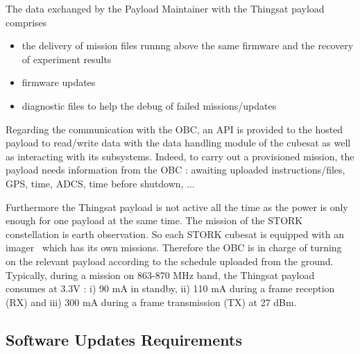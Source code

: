 The data exchanged by the Payload Maintainer with the Thingsat payload comprises 
\begin{itemize}
    \item the delivery of mission files runnng above the same firmware and the
    recovery of experiment results
    \item firmware updates
    \item diagnostic files to help the debug of failed missions/updates
\end{itemize} 



Regarding the communication with the OBC, an API is provided to the hosted
payload to read/write data with the data handling module of the cubesat as well
as interacting with its subsystems. Indeed, to carry out a provisioned mission,
the payload needs information from the OBC : awaiting uploaded
instructions/files, GPS, time, ADCS, time before shutdown, ...

Furthermore the Thingsat payload is not active all the time as the power is only
enough for one payload at the same time. The mission of the STORK constellation
is earth observation. So each STORK cubesat is equipped with an
imager~\cite{wiki:SatRevolution} which has its own missions. Therefore the OBC
is in charge of turning on the relevant payload according to the schedule
uploaded from the ground. Typically, during a mission on 863-870 MHz band, the
Thingsat payload consumes at 3.3V : i) 90 mA in standby, ii) 110 mA during a frame
reception (RX) and iii) 300 mA during a frame transmission (TX) at 27 dBm.

\subsection{Software Updates Requirements}


